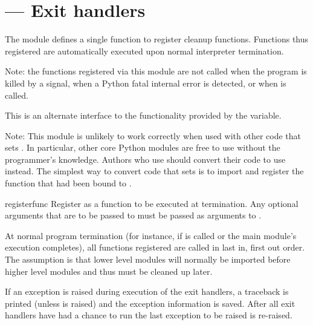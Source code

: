 \section{ ---
         Exit handlers}



The  module defines a single function to register
cleanup functions.  Functions thus registered are automatically
executed upon normal interpreter termination.

Note: the functions registered via this module are not called when the program is killed by a
signal, when a Python fatal internal error is detected, or when
 is called.

This is an alternate interface to the functionality provided by the
 variable.

Note: This module is unlikely to work correctly when used with other code
that sets .  In particular, other core Python modules are
free to use  without the programmer's knowledge.  Authors who
use  should convert their code to use
 instead.  The simplest way to convert code that sets
 is to import  and register the function
that had been bound to .

\begin{funcdesc}{register}{func}
Register  as a function to be executed at termination.  Any
optional arguments that are to be passed to  must be passed
as arguments to .

At normal program termination (for instance, if
 is called or the main module's execution
completes), all functions registered are called in last in, first out
order.  The assumption is that lower level modules will normally be
imported before higher level modules and thus must be cleaned up
later.

If an exception is raised during execution of the exit handlers, a
traceback is printed (unless  is raised) and the
exception information is saved.  After all exit handlers have had a
chance to run the last exception to be raised is re-raised.

\end{funcdesc}


